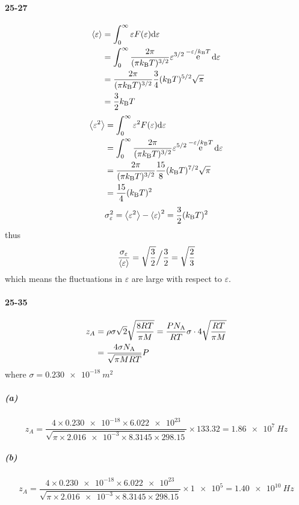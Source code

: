 \documentclass[a4paper]{article}
\DeclareMathOperator{\intinf}{\int_0^\infty}
\DeclareMathOperator{\e}{\mathrm{e}}
\newcommand{\NA}{N_\mathrm{A}}
\newcommand{\kB}{k_\mathrm{B}}
\newcommand{\ex}[1]{\paragraph{#1}}
\newcommand{\subex}[1]{\subparagraph{#1}}
\numberwithin{equation}{section}
\begin{document}
\ex{25-27}
\begin{align}
\ev{\varepsilon} &= \intinf \varepsilon F(\varepsilon)\dd\varepsilon \notag\\
&= \intinf \dfrac{2\pi}{(\pi \kB T)^{3/2}} \varepsilon^{3/2}\e^{-\varepsilon/\kB T}\dd\varepsilon \notag\\
&= \dfrac{2\pi}{(\pi \kB T)^{3/2}} \dfrac{3}{4}(\kB T)^{5/2}\sqrt{\pi} \notag\\
&= \dfrac{3}{2}\kB T
\end{align}
\begin{align}
\ev{\varepsilon^2} &= \intinf \varepsilon^2 F(\varepsilon)\dd\varepsilon \notag\\
&= \intinf \dfrac{2\pi}{(\pi \kB T)^{3/2}} \varepsilon^{5/2}\e^{-\varepsilon/\kB T}\dd\varepsilon \notag\\
&= \dfrac{2\pi}{(\pi \kB T)^{3/2}} \dfrac{15}{8}(\kB T)^{7/2}\sqrt{\pi} \notag\\
&=  \dfrac{15}{4}(\kB T)^2
\end{align}
\begin{equation}\label{key}
\sigma_\varepsilon^2 = \ev{\varepsilon^2} - \ev{\varepsilon}^2 = \dfrac{3}{2}(\kB T)^2
\end{equation}
thus
\begin{equation}\label{key}
\dfrac{\sigma_\varepsilon}{\ev{\varepsilon}} = \sqrt{\dfrac{3}{2}}{\Big /}\dfrac{3}{2} = \sqrt{\dfrac{2}{3}}
\end{equation}
which means the fluctuations in $ \varepsilon $ are large with respect to $ \varepsilon $.

\ex{25-35}
\begin{align}\label{key}
z_A &= \rho\sigma\sqrt{2}\sqrt{\dfrac{8RT}{\pi M}} = \dfrac{P \NA}{R T}\sigma \cdot 4\sqrt{\dfrac{RT}{\pi M}} \notag\\
&= \dfrac{4\sigma \NA}{\sqrt{\pi M RT}}P 
\end{align}
where $ \sigma = \SI{0.230e-18}{m^2} $
\subex{(a)}
\begin{equation}\label{key}
z_A = \dfrac{4\times\num{0.230e-18} \times \num{6.022e23}}{\sqrt{\pi\times \num{2.016e-3} \times\num{8.3145}\times 298.15}}\times 133.32 = \SI{1.86e7}{Hz}
\end{equation}
\subex{(b)}
\begin{equation}\label{key}
z_A = \dfrac{4\times\num{0.230e-18} \times \num{6.022e23}}{\sqrt{\pi\times \num{2.016e-3} \times\num{8.3145}\times 298.15}}\times \num{1e5} = \SI{1.40e10}{Hz}
\end{equation}
\end{document}
